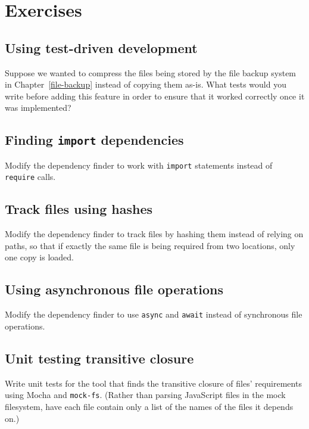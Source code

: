 \documentclass[krantzl]{krantz}
\newcommand{\chapref}[1]{Chapter~\ref{#1}}
\begin{document}
\section{Exercises}\label{module-bundler-exercises}

\subsection*{Using test-driven development}


Suppose we wanted to compress the files being stored by the file backup system in \chapref{file-backup}
instead of copying them as-is.
What tests would you write before adding this feature in order to ensure that it worked correctly
once it was implemented?

\subsection*{Finding \texttt{import} dependencies}


Modify the dependency finder to work with \texttt{import} statements instead of \texttt{require} calls.

\subsection*{Track files using hashes}


Modify the dependency finder to track files by hashing them instead of relying on paths,
so that if exactly the same file is being required from two locations,
only one copy is loaded.

\subsection*{Using asynchronous file operations}


Modify the dependency finder to use \texttt{async} and \texttt{await} instead of synchronous file operations.

\subsection*{Unit testing transitive closure}


Write unit tests for the tool that finds the transitive closure of files’ requirements
using Mocha and \texttt{mock-fs}.
(Rather than parsing JavaScript files in the mock filesystem,
have each file contain only a list of the names of the files it depends on.)
\end{document}
